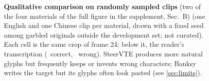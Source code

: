 \begin{figure}[t]
\begin{tabular}{@{}m{0.95cm}cccccc@{}}
\end{tabular}
\caption{\textbf{Qualitative comparison on randomly sampled clips} (two of the four materials of the full figure in the supplement, Sec.~B) (one English and one Chinese clip per material, drawn with a fixed seed among garbled originals outside the development set; not curated). Each cell is the same crop of frame 24; below it, the reader's transcription (\textcolor{okgreen}{}~correct, \textcolor{badred}{}~wrong). SteerVTE produces more natural glyphs but frequently keeps or invents wrong characters; Banksy writes the target but its glyphs often look pasted (see \cref{sec:limits}).}
\label{fig:qual}
\end{figure}
